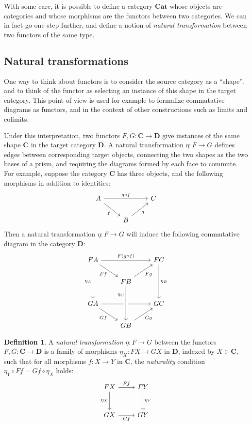 \documentclass[11pt,oneside]{book}
\theoremstyle{definition}
\newtheorem{definition}[theorem]{Definition}
\begin{document}
With some care,
it is possible to define a category $\mathbf{Cat}$
whose objects are categories and whose morphisms
are the functors between two categories.
We can in fact go one step further,
and define a notion of \emph{natural transformation}
between two functors of the same type.


\subsection{Natural transformations} %

One way to think about functors is
to consider the source category as a ``shape'',
and to think of the functor as
selecting an instance of this shape in the target category.
This point of view is used for example
to formalize commutative diagrams as functors,
and in the context of other constructions such as limits and colimits.

Under this interpretation,
two functors $F, G : \mathbf{C} \rightarrow \mathbf{D}$
give instances of the same shape $\mathbf{C}$
in the target category $\mathbf{D}$.
A natural transformation $\eta : F \rightarrow G$
defines edges between corresponding target objects,
connecting the two shapes as the two bases of a prism,
and requiring the diagrams formed by each face to commute.
For example, suppose the category $\mathbf{C}$ has three objects,
and the following morphisms in addition to identities:
\[
  \begin{tikzcd}
    A \ar[rr, "g \circ f"] \ar[rd, "f"'] & & C \\
    & B \ar[ur, "g"']
  \end{tikzcd}
\]
Then a natural transformation $\eta : F \rightarrow G$
will induce the following commutative diagram in the category $\mathbf{D}$:
\[
  \begin{tikzcd}
    F A \ar[dd, "\eta_A"'] \ar[rr, "F (g \circ f)"] \ar[rd, "F f"'] & &
    F C \ar[dd, "\eta_B"] \\
    & F B \ar[ur, "F g"'] \\
    G A \ar[rr] \ar[rd, "G f"'] & & G C \\
    & G B \ar[ur, "G g"'] \ar[uu, <-, crossing over, near end, "\eta_C"]
  \end{tikzcd}
\]

\begin{definition} \label{def:nattrans} %
A \emph{natural transformation} $\eta : F \rightarrow G$ between
the functors $F, G : \mathbf{C} \rightarrow \mathbf{D}$
is a family of morphisms $\eta_X : F X \rightarrow G X$ in ${\mathbf{D}}$,
indexed by $X \in \mathbf{C}$,
such that for all morphisms
$f : X \rightarrow Y$ in $\mathbf{C}$,
the \emph{naturality} condition
$\eta_Y \circ F f = G f \circ \eta_X$
holds:
\[
  \begin{tikzcd}[row sep=large]
    F X \ar[r, "F f"] \ar[d, "\eta_X"'] & F Y \ar[d, "\eta_Y"] \\
    G X \ar[r, "G f"'] & G Y
  \end{tikzcd}
\]
\end{definition}
\end{document}
